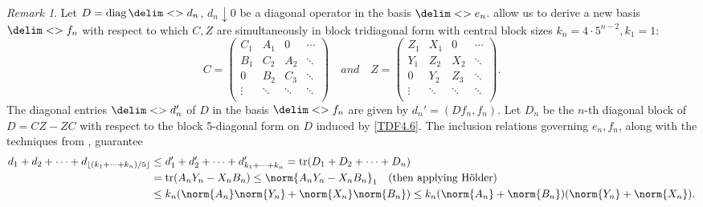 \documentclass[10pt,reqno]{amsart}
\theoremstyle{remark}
\newtheorem{remark}[theorem]{Remark}
\DeclareMathOperator{\diag}{diag}
\DeclareMathOperator{\trace}{tr}
\newcommand{\seq}{\delim<>}
\numberwithin{equation}{section}
\begin{document}
\begin{remark}
  Let $D = \diag \seq{d_n}$, $d_n \downarrow 0$ be a diagonal operator in the basis $\seq{e_n}$.
   allow us to derive a new basis $\seq{f_n}$ with respect to which $C,Z$ are simultaneously in block tridiagonal form with central block sizes $k_n = 4\cdot 5^{n-2}, k_1=1$:
  \begin{equation}
    \label{TDF4.6}
    C =
    \begin{pmatrix}
      C_1 &  A_1  &0   & \cdots        \\
      B_1 & C_2&A_2  &  \ddots            \\
      0 &B_2 &C_3 & \ddots             \\
      \vdots &\ddots &\ddots  &\ddots  \\
    \end{pmatrix}
    \quad and \quad
    Z =
    \begin{pmatrix}
      Z_1 & X _1  &0   & \cdots        \\
      Y_1 & Z_2&X_2  &  \ddots            \\
      0 &Y_2 &Z_3 & \ddots             \\
      \vdots &\ddots &\ddots  &\ddots  \\
    \end{pmatrix}.
  \end{equation}
  The diagonal entries $\seq{d_n'}$ of $D$ in the basis $\seq{f_n}$ are given by $d_n' = (Df_n,f_n)$.
  Let $D_n$ be the $n$-th diagonal block of $D = CZ-ZC$ with respect to the block 5-diagonal form on $D$ induced by \eqref{TDF4.6}.
  The inclusion relations governing $e_n,f_n$, along with the techniques from , guarantee
  \begin{align*}
    d_1 + d_2 + \cdots + d_{\lfloor ({k_1 + \cdots + k_n})/{5}\rfloor} &\le d_1' + d_2' + \cdots + d_{k_1 + \cdots + k_n}' = \trace(D_1+D_2+\dots+D_n)\\
                                                                       &=\trace(A_nY_n - X_nB_n) \le \norm{A_nY_n - X_nB_n}_1 \quad \text{(then applying H\"{o}lder)} \\
                                                                       &\le k_n(\norm{A_n}\norm{Y_n} + \norm{X_n}\norm{B_n}) \le k_n(\norm{A_n}+\norm{B_n})(\norm{Y_n} + \norm{X_n}).
  \end{align*}


\end{remark}
\end{document}
